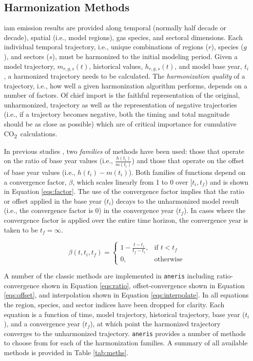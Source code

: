 \documentclass[review]{elsarticle}
\newcommand{\code}[1]{\lstinline[basicstyle=\ttfamily\color{black}]|#1|}
\newcommand{\codeb}[1]{\texttt{#1}}
\newcommand{\cotwo}{CO\textsubscript{2}~}
\begin{document}
\subsection{Harmonization Methods}

\gls{iam} emission results are provided along temporal (normally half decade or
decade), spatial (i.e., model regions), gas species, and sectoral
dimensions. Each individual temporal trajectory, i.e., unique combinations of
regions ($r$), species ($g$), and sectors ($s$), must be harmonized to the
initial modeling period. Given a model trajectory, $m_{r, g, s}(t)$, historical
values, $h_{r, g, s}(t)$, and model base year, $t_i$, a harmonized trajectory
needs to be calculated. The \textit{harmonization quality} of a trajectory,
i.e., how well a given harmonization algorithm performs, depends on a number of
factors. Of chief import is the faithful representation of the original,
unharmonized, trajectory as well as the representation of negative trajectories
(i.e., if a trajectory becomes negative, both the timing and total magnitude
should be as close as possible) which are of critical importance for cumulative
\cotwo calculations.

In previous studies \cite{meinshausen_rcp_2011,rogelj_discrepancies_2011}, two
\textit{families} of methods have been used: those that operate on the ratio of
base year values (i.e., $\frac{h(t_i)}{m(t_i)}$) and those that operate on the
offset of base year values (i.e., $h(t_i) - m(t_i)$). Both families of functions
depend on a convergence factor, $\beta$, which scales linearly from 1 to 0 over
$[t_i, t_f)$ and is shown in Equation \ref{eqs:factor}. The use of the
  convergence factor implies that the ratio or offset applied in the base year
  ($t_i$) decays to the unharmonized model result (i.e., the convergence factor
  is 0) in the convergence year ($t_f$). In cases where the convergence factor
  is applied over the entire time horizon, the convergence year is taken to be
  $t_f = \infty$.

\begin{equation}\label{eqs:factor}
  \beta(t, t_i, t_f) =
  \begin{cases}
    1 - \frac{t - t_i}{t_f - t_i},& \text{if } t < t_f\\
    0,                        & \text{otherwise}
  \end{cases}
\end{equation}

A number of the classic methods are implemented in \code{aneris} including
ratio-convergence shown in Equation \ref{eqs:ratio}, offset-convergence shown in
Equation \ref{eqs:offset}, and interpolation shown in Equation
\ref{eqs:interpolate}. In all equations the region, species, and sector indices
have been dropped for clarity. Each equation is a function of time, model
trajectory, historical trajectory, base year ($t_i$), and a convergence year
($t_f$), at which point the harmonized trajectory converges to the unharmonized
trajectory. \codeb{aneris} provides a number of methods to choose from for each
of the harmonization families. A summary of all available methods is provided in
Table \ref{tab:meths}. 
\end{document}
